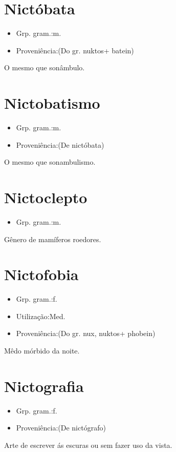 \section{Nictóbata}
\begin{itemize}
\item {Grp. gram.:m.}
\end{itemize}
\begin{itemize}
\item {Proveniência:(Do gr. \textunderscore nuktos\textunderscore  + \textunderscore batein\textunderscore )}
\end{itemize}
O mesmo que \textunderscore sonâmbulo\textunderscore .
\section{Nictobatismo}
\begin{itemize}
\item {Grp. gram.:m.}
\end{itemize}
\begin{itemize}
\item {Proveniência:(De \textunderscore nictóbata\textunderscore )}
\end{itemize}
O mesmo que \textunderscore sonambulismo\textunderscore .
\section{Nictoclepto}
\begin{itemize}
\item {Grp. gram.:m.}
\end{itemize}
Gênero de mamíferos roedores.
\section{Nictofobia}
\begin{itemize}
\item {Grp. gram.:f.}
\end{itemize}
\begin{itemize}
\item {Utilização:Med.}
\end{itemize}
\begin{itemize}
\item {Proveniência:(Do gr. \textunderscore nux\textunderscore , \textunderscore nuktos\textunderscore  + \textunderscore phobein\textunderscore )}
\end{itemize}
Mêdo mórbido da noite.
\section{Nictografia}
\begin{itemize}
\item {Grp. gram.:f.}
\end{itemize}
\begin{itemize}
\item {Proveniência:(De \textunderscore nictógrafo\textunderscore )}
\end{itemize}
Arte de escrever ás escuras ou sem fazer uso da vista.
